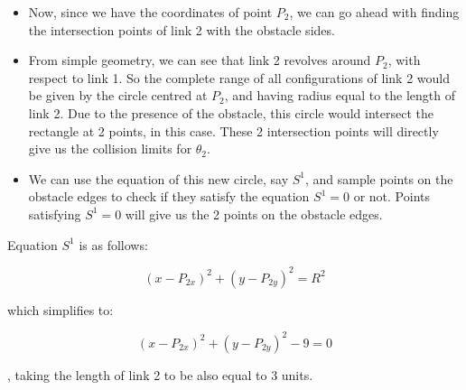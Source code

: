 \documentclass[12pt]{article}
\begin{document}
\begin{itemize}
    \item Now, since we have the coordinates of point \(P_2\), we can go ahead with finding the intersection points of link 2 with the obstacle sides.
    
    \item From simple geometry, we can see that link 2 revolves around \(P_2\), with respect to link 1. So the complete range of all configurations of link 2 would be given by the circle centred at \(P_2\), and having radius equal to the length of link 2. Due to the presence of the obstacle, this circle would intersect the rectangle at 2 points, in this case. These 2 intersection points will directly give us the collision limits for \(\theta_2\).
    
    \item We can use the equation of this new circle, say \(S^1\), and sample points on the obstacle edges to check if they satisfy the equation \(S^1 = 0\) or not. Points satisfying \(S^1 = 0\) will give us the 2 points on the obstacle edges.
\end{itemize}

Equation \(S^1\) is as follows:

\[
(x - P_{2x})^2 + (y - P_{2y})^2 = R^2
\]

\clearpage
which simplifies to:

\[
(x - P_{2x})^2 + (y - P_{2y})^2 - 9 = 0
\]

, taking the length of link 2 to be also equal to 3 units.
\end{document}
